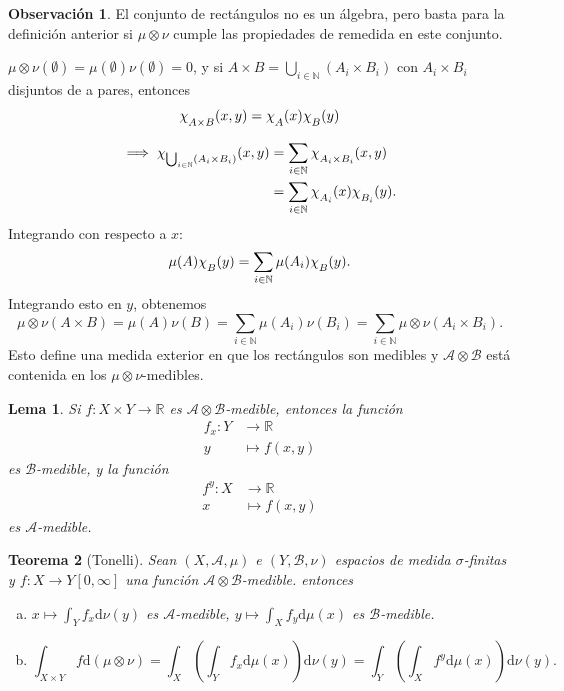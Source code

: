\documentclass{article}
\newtheorem{theorem}{Teorema}[subsection]
\newtheorem{lemma}[theorem]{Lema}
\theoremstyle{definition}
\newtheorem*{obs}{Observación}
\theoremstyle{remark}
\numberwithin{equation}{section}
\newcommand{\N}{\mathbb{N}}
\newcommand{\R}{\mathbb{R}}
\newcommand{\Acal}{\mathcal{A}}
\newcommand{\Bcal}{\mathcal{B}}
\renewcommand{\d}{\mathrm{d}}
\newcommand{\oo}{\infty}
\newcommand{\br}[1]{\left( #1 \right)}
\newcommand{\Chi}[1]{\chi_{\raisebox{-.5ex}{$\scriptstyle #1$}}}
\newcommand{\olon}{\colon}
\begin{document}
\begin{obs}
  El conjunto de rectángulos no es un álgebra, pero basta para la definición anterior si $\mu \otimes \nu$ cumple las propiedades de remedida en este conjunto.

  $\mu \otimes \nu(\emptyset) = \mu(\emptyset) \nu(\emptyset) = 0$, y si $A \times B = \bigcup_{i \in \N} (A_i \times B_i)$ con $A_i \times B_i$ disjuntos de a pares, entonces
  \[ \Chi{A \times B} (x,y) = \Chi{A}(x) \Chi{B}(y) \]
  
  \begin{align*}
      \implies \Chi{\bigcup_{i\in\N}(A_i \times B_i)}(x,y)
      &= \sum_{i\in \N} \Chi{A_i \times B_i} (x,y) \\
      &= \sum_{i \in \N} \Chi{A_i}(x) \Chi{B_i}(y).
  \end{align*}
  Integrando con respecto a $x$:
  \[ \mu(A) \Chi{B}(y) = \sum_{i \in \N} \mu(A_i) \Chi{B}(y). \]
  Integrando esto en $y$, obtenemos
  \[ \mu \otimes \nu(A \times B) = \mu(A) \nu(B) = \sum_{i\in\N} \mu(A_i) \nu(B_i) = \sum_{i\in\N} \mu \otimes \nu(A_i \times B_i). \]
  Esto define una medida exterior en que los rectángulos son medibles y $\Acal \otimes \Bcal$ está contenida en los $\mu \otimes \nu$-medibles.
\end{obs}

\begin{lemma}
  Si $f \colon X \times Y \to \R$ es $\Acal \otimes \Bcal$-medible, entonces la función
  \begin{align*}
      f_x \colon Y &\to \R \\
      y &\mapsto f(x,y)
  \end{align*}
  es $\Bcal$-medible, y la función
  \begin{align*}
      f^y \colon X &\to \R \\
      x &\mapsto f(x,y)
  \end{align*}
  es $\Acal$-medible.
\end{lemma}

\begin{theorem}
  [Tonelli]
  Sean $(X,\Acal,\mu)$ e $(Y,\Bcal,\nu)$ espacios de medida $\sigma$-finitas y $f \olon X \to Y [0,\oo]$ una función $\Acal \otimes \Bcal$-medible. entonces
  \begin{enumerate}[(a)]
    \item $x \mapsto \int_Y f_x \d\nu(y)$ es $\Acal$-medible, $y \mapsto \int_X f_y \d\mu(x)$ es $\Bcal$-medible.
    \item 
    \[ \int_{X \times Y} f \d(\mu \otimes \nu)
    = \int_X \br{\int_Y f_x \d\mu(x)} \d\nu(y)
    = \int_Y \br{\int_X f^y \d\mu(x)} \d\nu(y). \]
  \end{enumerate}
\end{theorem}
\end{document}
